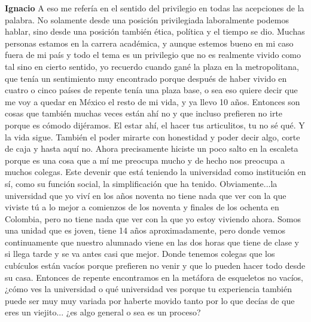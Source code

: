 \documentclass[
  spanish,
  11pt,
  a4paper,
]{scrbook}
\newenvironment{transcripcion}{
    \begin{list}{}{
        \setlength{\leftmargin}{1.5em}  %
        \setlength{\rightmargin}{0em}
        \setlength{\itemsep}{0.2em}     %
        \setlength{\parsep}{0.0em}
        \setlength{\listparindent}{0pt}
    }
}{
    \end{list}
}
\newcommand{\personaje}[1]{\textbf{#1}\quad}
\begin{document}
\begin{transcripcion}
\item \personaje{Ignacio} A eso me refería en el sentido del privilegio en todas las acepciones de la palabra. No solamente desde una posición privilegiada laboralmente podemos hablar, sino desde una posición también ética, política y el tiempo se dio. Muchas personas estamos en la carrera académica, y aunque estemos bueno en mi caso fuera de mi país y todo el tema es un privilegio que no es realmente vivido como tal sino en cierto sentido, yo recuerdo cuando gané la plaza en la metropolitana, que tenía un sentimiento muy encontrado porque después de haber vivido en cuatro o cinco países de repente tenía una plaza base, o sea eso quiere decir que me voy a quedar en México el resto de mi vida, y ya llevo 10 años. Entonces son cosas que también muchas veces están ahí no y que incluso prefieren no irte porque es cómodo dijéramos. El estar ahí, el hacer tus articulitos, tu no sé qué. Y la vida sigue. También el poder mirarte con honestidad y poder decir algo, corte de caja y hasta aquí no. Ahora precisamente hiciste un poco salto en la escaleta porque es una cosa que a mí me preocupa mucho y de hecho nos preocupa a muchos colegas. Este devenir que está teniendo la universidad como institución en sí, como su función social, la simplificación que ha tenido. Obviamente...la universidad que yo viví en los años noventa no tiene nada que ver con la que viviste tú a lo mejor a comienzos de los noventa y finales de los ochenta en Colombia, pero no tiene nada que ver con la que yo estoy viviendo ahora. Somos una unidad que es joven, tiene 14 años aproximadamente, pero donde vemos continuamente que nuestro alumnado viene en las dos horas que tiene de clase y si llega tarde y se va antes casi que mejor. Donde tenemos colegas que los cubículos están vacíos porque prefieren no venir y que lo pueden hacer todo desde su casa. Entonces de repente encontramos en la metáfora de esqueletos no vacíos, ¿cómo ves la universidad o qué universidad ves porque tu experiencia también puede ser muy muy variada por haberte movido tanto por lo que decías de que eres un viejito... ¿es algo general o sea es un proceso?


\end{transcripcion}
\end{document}
